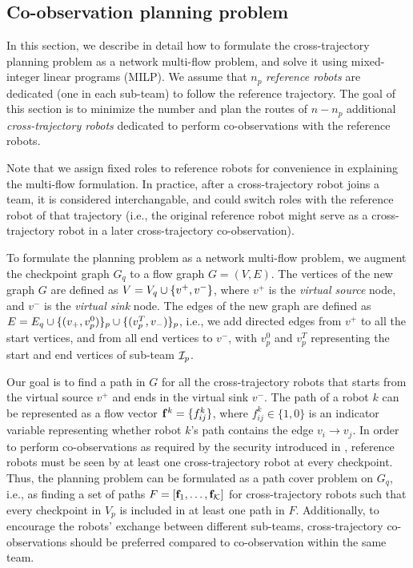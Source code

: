 \documentclass[journal]{IEEEtran}  %
\begin{document}

\subsection{Co-observation planning problem}
In this section, we describe in detail how to formulate the cross-trajectory planning problem as a network multi-flow problem, and solve it using mixed-integer linear programs (MILP). We assume that $n_p$ \emph{reference robots} are dedicated (one in each sub-team) to follow the reference trajectory.  The goal of this section is to minimize the number and plan the routes of $n-n_p$  additional \emph{cross-trajectory robots} dedicated to perform co-observations with the reference robots. 

\begin{remark}
Note that we assign fixed roles to reference robots for convenience in explaining the multi-flow formulation. In practice, after a cross-trajectory robot joins a team, it is considered interchangable, and could switch roles with the reference robot of that trajectory (i.e., the original reference robot might serve as a cross-trajectory robot in a later cross-trajectory co-observation).
\end{remark}

To formulate the planning problem as a network multi-flow problem, we augment the checkpoint graph $G_{q}$ to a flow graph $G=(V, E)$. The vertices of the new graph $G$ are defined as $V= V_{q} \cup \{v^{+},v^{-}\}$, where $v^{+}$ is the \emph{virtual source} node, and $v^{-}$ is the \emph{virtual sink} node. The edges of the new graph are defined as $E = E_{q} \cup \{(v_{+},v^{0}_{p})\}_{p} \cup \{( v^{T}_{p},v_{-})\}_{p}$, i.e., we add directed edges from $v^{+}$ to all the start vertices, and from all end vertices to $v^{-}$, with $v^0_p$ and $v^T_p$ representing the start and end vertices of sub-team $\mathcal{I}_p$.

Our goal is to find a path in $G$ for all the cross-trajectory robots that starts from the virtual source $v^{+}$ and ends in the virtual sink $v^{-}$.
The path of a robot $k$ can be represented as a flow vector $\mathbf{f}^{k} = \{ f^{k}_{ij} \}$, where $f^{k}_{ij} \in \{1,0\}$ is an indicator variable representing whether robot $k$'s path contains the edge $v_{i}\to v_{j}$. 
In order to perform co-observations as required by the security introduced in , reference robots must be seen by at least one cross-trajectory robot at every checkpoint.
Thus, the planning problem can be formulated as a path cover problem on $G_{q}$, i.e., as finding a set of paths $F=[\mathbf{f}_{1},\dots, \mathbf{f}_{\mathcal{K}}]$ for cross-trajectory robots such that every checkpoint in $V_{p}$ is included in at least one path in $F$. Additionally, to encourage the robots' exchange between different sub-teams, cross-trajectory co-observations should be preferred compared to co-observation within the same team. 
\end{document}
